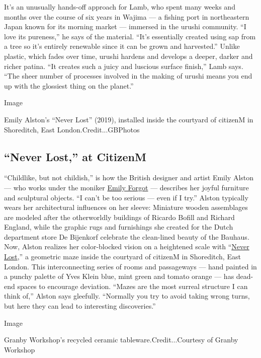 It's an unusually hands-off approach for Lamb, who spent many weeks and
months over the course of six years in Wajima --- a fishing port in
northeastern Japan known for its morning market --- immersed in the
urushi community. ``I love its pureness,'' he says of the material.
``It's essentially created using sap from a tree so it's entirely
renewable since it can be grown and harvested.'' Unlike plastic, which
fades over time, urushi hardens and develops a deeper, darker and richer
patina. ``It creates such a juicy and luscious surface finish,'' Lamb
says. ``The sheer number of processes involved in the making of urushi
means you end up with the glossiest thing on the planet.''

Image

Emily Alston's ``Never Lost'' (2019), installed inside the courtyard of
citizenM in Shoreditch, East London.Credit...GBPhotos

\hypertarget{never-lost-at-citizenm}{%
\subsection{``Never Lost,'' at CitizenM}\label{never-lost-at-citizenm}}

``Childlike, but not childish,'' is how the British designer and artist
Emily Alston --- who works under the moniker
\href{http://www.emilyforgot.co.uk/}{Emily Forgot} --- describes her
joyful furniture and sculptural objects. ``I can't be too serious ---
even if I try.'' Alston typically wears her architectural influences on
her sleeve: Miniature wooden assemblages are modeled after the
otherworldly buildings of Ricardo Bofill and Richard England, while the
graphic rugs and furnishings she created for the Dutch department store
De Bijenkorf celebrate the clean-lined beauty of the Bauhaus. Now,
Alston realizes her color-blocked vision on a heightened scale with
``\href{https://www.londondesignfestival.com/event/never-lost-citizenm-shoreditch}{Never
Lost},'' a geometric maze inside the courtyard of citizenM in
Shoreditch, East London. This interconnecting series of rooms and
passageways --- hand painted in a punchy palette of Yves Klein blue,
mint green and tomato orange --- has dead-end spaces to encourage
deviation. ``Mazes are the most surreal structure I can think of,''
Alston says gleefully. ``Normally you try to avoid taking wrong turns,
but here they can lead to interesting discoveries.''

Image

Granby Workshop's recycled ceramic tableware.Credit...Courtesy of Granby
Workshop

